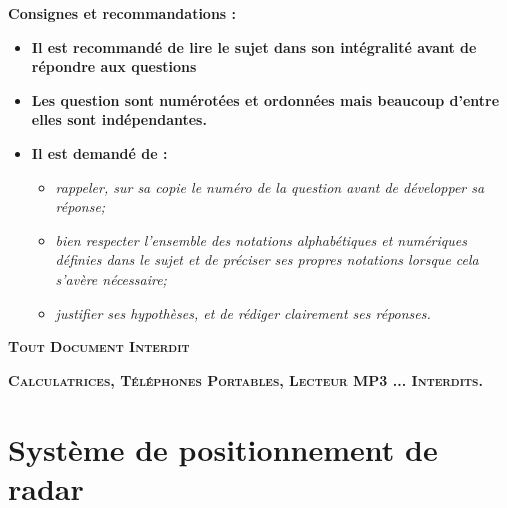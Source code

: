 \documentclass[10pt,oneside]{article}
\begin{document}
\textbf{Consignes et recommandations :}
\begin{itemize}
\item \textbf{Il est recommandé de lire le sujet dans son intégralité avant de
répondre aux questions}
\item \textbf{Les question sont numérotées et ordonnées mais beaucoup d'entre elles sont indépendantes.}
\item \textbf{Il est demandé de :}
\begin{itemize}
\item \textit{rappeler, sur sa copie le numéro de la question avant de développer sa réponse;}
\item \textit{bien respecter l'ensemble des notations alphabétiques et numériques définies dans le sujet et de préciser ses propres notations lorsque cela s'avère nécessaire;}
\item \textit{justifier ses hypothèses, et de rédiger clairement ses réponses.}

\end{itemize}
\end{itemize}

\vfill

\begin{center}
\textsc{\textbf{Tout Document Interdit}}

 \textsc{\textbf{Calculatrices, Téléphones Portables, Lecteur MP3 ...
Interdits.}}

\end{center}

\newpage


\section{Système de positionnement de radar}
\end{document}
